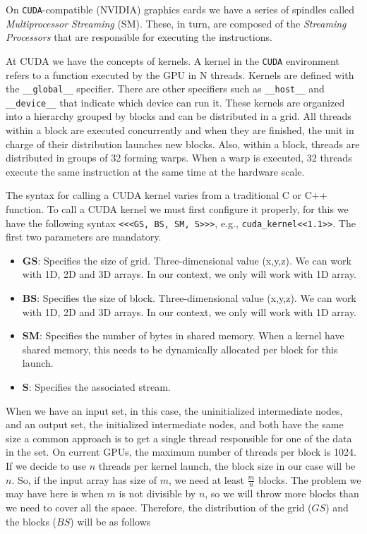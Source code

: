 \documentclass[titlepage,12pt]{report}
\begin{document}
On \texttt{CUDA}-compatible (NVIDIA) graphics cards we have a series of spindles called \textit{Multiprocessor Streaming} (SM). These, in turn, are composed of the \textit{Streaming Processors} that are responsible for executing the instructions.

At CUDA we have the concepts of kernels. A kernel in the \texttt{CUDA} environment refers to a function executed by the GPU in N threads. Kernels are defined with the \lstinline|__global__| specifier. There are other specifiers such as \lstinline|__host__| and \lstinline|__device__| that indicate which device can run it. These kernels are organized into a hierarchy grouped by blocks and can be distributed in a grid. All threads within a block are executed concurrently and when they are finished, the unit in charge of their distribution launches new blocks. Also, within a block, threads are distributed in groups of 32 forming warps. When a warp is executed, 32 threads execute the same instruction at the same time at the hardware scale.

The syntax for calling a CUDA kernel varies from a traditional C or C++ function. To call a CUDA kernel we must first configure it properly, for this we have the following syntax \lstinline|<<<GS, BS, SM, S>>>|, e.g., \lstinline|cuda_kernel<<1.1>>|. The first two parameters are mandatory.

\begin{itemize}

\item \textbf{GS}: Specifies the size of grid. Three-dimensional value (x,y,z). We can work with 1D, 2D and 3D arrays. In our context, we only will work with 1D array.
\item \textbf{BS}: Specifies the size of block. Three-dimensional value (x,y,z). We can work with 1D, 2D and 3D arrays. In our context, we only will work with 1D array.
\item \textbf{SM}: Specifies the number of bytes in shared memory. When a kernel have shared memory, this needs to be dynamically allocated per block for this launch.
\item \textbf{S}: Specifies the associated stream.

\end{itemize}

When we have an input set, in this case, the uninitialized intermediate nodes, and an output set, the initialized intermediate nodes, and both have the same size a common approach is to get a single thread responsible for one of the data in the set. On current GPUs, the maximum number of threads per block is 1024. If we decide to use $n$ threads per kernel launch, the block size in our case will be $n$. So, if the input array has size of $m$, we need at least $\frac{m}{n}$ blocks. The problem we may have here is when $m$ is not divisible by $n$, so we will throw more blocks than we need to cover all the space. Therefore, the distribution of the grid ($GS$) and the blocks ($BS$) will be as follows
\end{document}
